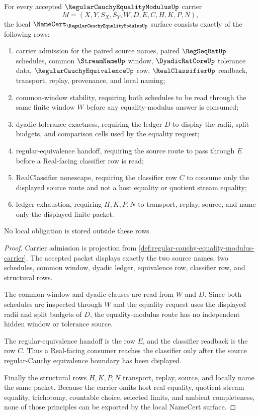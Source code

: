 \begin{theorem}
\label{thm:regular-cauchy-equality-modulus-namecert-obligations}
For every accepted $\RegularCauchyEqualityModulusUp$ carrier
$$
M=(X,Y,S_X,S_Y,W,D,E,C,H,K,P,N),
$$
the local $\NameCert_{\RegularCauchyEqualityModulusUp}$ surface consists exactly of the following rows:
\begin{enumerate}
\item carrier admission for the paired source names, paired $\RegSeqRatUp$ schedules, common $\StreamNameUp$ window, $\DyadicRatCoreUp$ tolerance data, $\RegularCauchyEquivalenceUp$ row, $\RealClassifierUp$ readback, transport, replay, provenance, and local naming;
\item common-window stability, requiring both schedules to be read through the same finite window $W$ before any equality-modulus answer is consumed;
\item dyadic tolerance exactness, requiring the ledger $D$ to display the radii, split budgets, and comparison cells used by the equality request;
\item regular-equivalence handoff, requiring the source route to pass through $E$ before a Real-facing classifier row is read;
\item RealClassifier nonescape, requiring the classifier row $C$ to consume only the displayed source route and not a host equality or quotient stream equality;
\item ledger exhaustion, requiring $H,K,P,N$ to transport, replay, source, and name only the displayed finite packet.
\end{enumerate}
No local obligation is stored outside these rows.
\end{theorem}
\begin{proof}
Carrier admission is projection from \autoref{def:regular-cauchy-equality-modulus-carrier}. The accepted packet displays exactly the two source names, two schedules, common window, dyadic ledger, equivalence row, classifier row, and structural rows.

The common-window and dyadic clauses are read from $W$ and $D$. Since both schedules are inspected through $W$ and the equality request uses the displayed radii and split budgets of $D$, the equality-modulus route has no independent hidden window or tolerance source.

The regular-equivalence handoff is the row $E$, and the classifier readback is the row $C$. Thus a Real-facing consumer reaches the classifier only after the source regular-Cauchy equivalence boundary has been displayed.

Finally the structural rows $H,K,P,N$ transport, replay, source, and locally name the same packet. Because the carrier omits host real equality, quotient stream equality, trichotomy, countable choice, selected limits, and ambient completeness, none of those principles can be exported by the local NameCert surface.
\end{proof}


